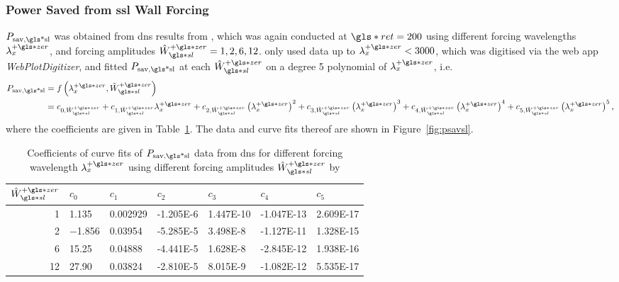 \subsubsection{Power Saved from \gls*{ssl} Wall Forcing}
$P_\text{sav,\gls*{sl}} $ was obtained from \gls*{dns} results from \textcite{viotti2009}, which was again conducted at $\gls*{ret}=200$ using different forcing wavelengths $\lambda_x\pz$, and forcing amplitudes $\hat{W}\pz\ssl=1,2,6,12$. \textcite{chernyshenko2013} only used data up to $\lambda_x\pz<3000$, which was digitised via the web app \textit{WebPlotDigitizer}, and fitted $P_\text{sav,\gls*{sl}}$ at each $\hat{W}\pz\ssl$ on a degree 5 polynomial of $\lambda_x\pz$, i.e.
\begin{align}
	P_\text{sav,\gls*{sl}} &= f\left(\lambda_x\pz,\hat{W}\pz\ssl\right)\\
			       &= c_{0,\hat{W}\pz\ssl} + c_{1,\hat{W}\pz\ssl}\lambda_x\pz+c_{2,\hat{W}\pz\ssl}\left(\lambda_x\pz\right)^{2}+c_{3,\hat{W}\pz\ssl}\left(\lambda_x\pz\right)^{3}+c_{4,\hat{W}\pz\ssl}\left(\lambda_x\pz\right)^{4}+c_{5,\hat{W}\pz\ssl}\left(\lambda_x\pz\right)^{5}\label{eq:psavsl}
,\end{align}
where the coefficients are given in Table~\ref{tab:psavslcoeff}. The data and curve fits thereof are shown in Figure~\ref{fig:psavsl}.
\begin{table}[htbp]
	\centering
	\begin{tabular}{r|llllll}
		$\hat{W}\pz\ssl$ & $c_0$ & $c_1$ & $c_2$ & $c_3$ & $c_4$ & $c_5$\\
		\hline
		1 & \num{1.135} &  \num{0.002929} &  \num{-1.205E-6} &  \num{1.447E-10} &  \num{-1.047E-13} &  \num{2.609E-17}\\
		2 & \num{-1.856} &  \num{0.03954} &  \num{-5.285E-5} &  \num{3.498E-8} &  \num{-1.127E-11} &  \num{1.328E-15}\\
		6 & \num{15.25} &  \num{0.04888} &  \num{-4.441E-5} &  \num{1.628E-8} &  \num{-2.845E-12} &  \num{1.938E-16}\\
		12 & \num{27.90} &  \num{0.03824} &  \num{-2.810E-5} &  \num{8.015E-9} &  \num{-1.082E-12} &  \num{5.535E-17}
	\end{tabular}
	\caption[Coefficients of curvefits of $P_\text{sav,\gls*{sl}} $]{Coefficients of curve fits of $P_\text{sav,\gls*{sl}} $ data from \gls*{dns} for different forcing wavelength $\lambda_x\pz$ using different forcing amplitudes $\hat{W}\pz\ssl$ by \textcite{viotti2009}}
	\label{tab:psavslcoeff}
\end{table}

